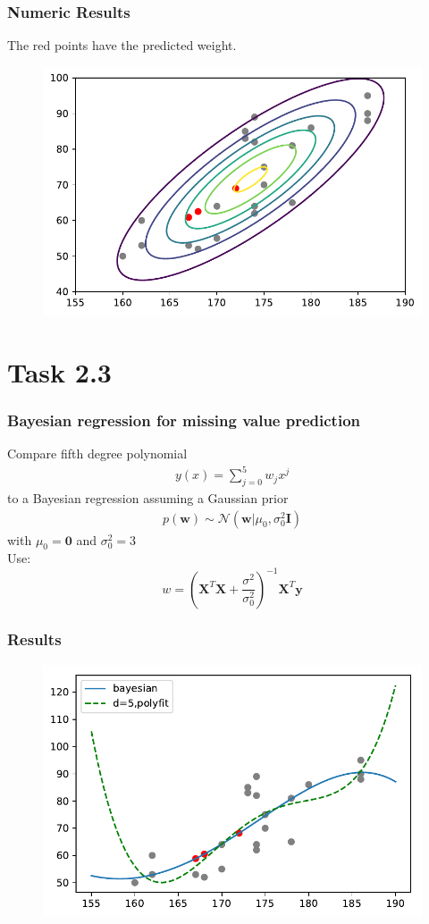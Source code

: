 \documentclass{beamer}
\begin{document}
\begin{frame}
	\frametitle{Numeric Results}
	The red points have the predicted weight.
	\begin{figure}
		\includegraphics[width=0.9\linewidth]{graphics/contours}
	\end{figure}
\end{frame}

\section{Task 2.3}

\begin{frame}
\frametitle{Bayesian regression for missing value prediction}
Compare fifth degree polynomial
\begin{align*}
y(x) = \sum_{j=0}^{5}w_jx^j
\end{align*}
to a Bayesian regression assuming a Gaussian prior
\begin{align*}
p(\mathbf{w}) \sim \mathcal{N}(\mathbf{w}|\mu_0,\sigma^2_0\mathbf{I})
\end{align*}
with $\mu_0=\mathbf{0}$ and $\sigma^2_0=3$ \\\medskip
Use: \[w = (\mathbf{X}^T\mathbf{X}+ \frac{\sigma^2}{\sigma_0^2})^{-1}\mathbf{X}^T\mathbf{y}\]

\end{frame}

\begin{frame}
	\frametitle{Results}
	\begin{figure}
		\includegraphics[height=0.8\textheight]{graphics/task3}
	\end{figure}
\end{frame}
\end{document}
